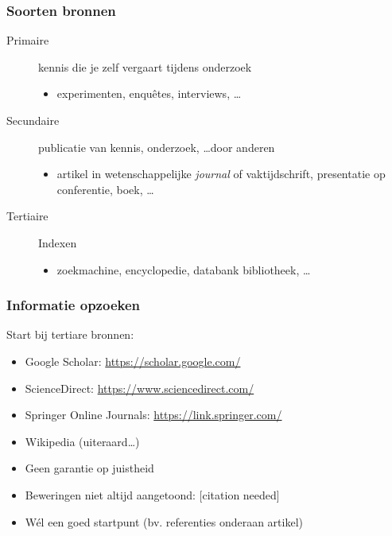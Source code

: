 \documentclass[aspectratio=169]{beamer}
\begin{document}
\begin{frame}
  \frametitle{Soorten bronnen}

  \begin{description}
    \item[Primaire] kennis die je zelf vergaart tijdens onderzoek
      \begin{itemize}
        \item experimenten, enquêtes, interviews, \ldots
      \end{itemize}
    \item[Secundaire] publicatie van kennis, onderzoek, \ldots door anderen
      \begin{itemize}
        \item artikel in wetenschappelijke \emph{journal} of vaktijdschrift, presentatie op conferentie, boek, \ldots
      \end{itemize}
    \item[Tertiaire] Indexen
      \begin{itemize}
        \item zoekmachine, encyclopedie, databank bibliotheek, \ldots
      \end{itemize}
  \end{description}

\end{frame}

\begin{frame}
  \frametitle{Informatie opzoeken}

  Start bij \alert{tertiare} bronnen:

  \begin{itemize}
    \item Google Scholar: \url{https://scholar.google.com/}
    \item ScienceDirect: \url{https://www.sciencedirect.com/}
    \item Springer Online Journals: \url{https://link.springer.com/}
    \item Wikipedia (uiteraard\dots)
  \end{itemize}


  \pause

  \begin{itemize}
    \item Geen garantie op juistheid
    \item Beweringen niet altijd aangetoond: [citation needed]
    \item \alert{Wél} een goed startpunt (bv. referenties onderaan artikel)
  \end{itemize}
\end{frame}
\end{document}
